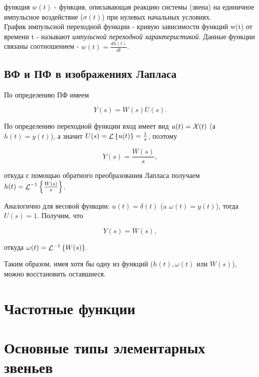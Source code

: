\documentclass[../../TAU.tex]{subfiles}
\begin{document}
     функция $w(t)$ - функция, описывающая реакцию системы (звена) на единичное импульсное воздействие ($\sigma(t)$) при нулевых начальных условиях.\\ 
    График импульсной переходной функции - кривую зависимости функций w(t) от времени t - называют {\it импульсной переходной характеристикой}.
    Данные функции связаны соотношением - $w(t) = \frac{dh(t)}{dt}$.



\subsection{ВФ и ПФ в изображениях Лапласа } %

    По определению ПФ имеем
    
    $$
        Y(s) = W(s)U(s).
    $$

    По определению переходной функции вход имеет вид 
    $u(t) = \mathcal{X}(t)$ 
    (а~$h(t) = y(t)$), а значит 
    $U(s) = \mathop{\mathcal{L}}\nolimits\left\{u(t)\right\} = \frac{1}{s}$, поэтому
    
    $$
        Y(s) = \frac{W(s)}{s},
    $$
    
    откуда с помощью обратного преобразования Лапласа получаем 
    $h(t) = {\mathop{\mathcal{L}}\nolimits^{-1}\left\{\frac{W(s)}{s}\right\}}$.

    Аналогично для весовой функции: 
    $u(t) = \delta(t)$ 
    (a $\omega(t) = y(t)$), тогда $U(s)=1$. Получим, что
    
    $$
        Y(s) = W(s),
    $$
    
    откуда 
    $\omega(t) = {\mathop{\mathcal{L}}\nolimits^{-1}\left\{W(s)\right\}}$.

    Таким образом, имея хотя бы одну из функций ($h(t), \omega(t)$ или $W(s)$), можно восстановить оставшиеся.



\section{Частотные функции} %


\section{Основные типы элементарных звеньев} %
\end{document}
